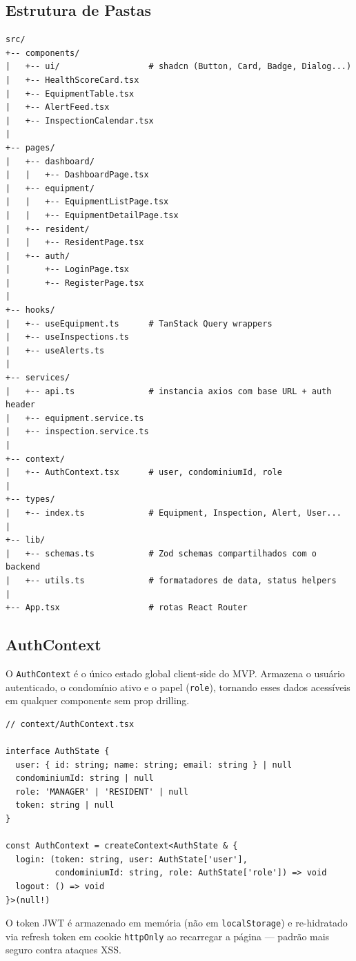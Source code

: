 \documentclass[12pt, a4paper]{article}
\begin{document}
\subsection{Estrutura de Pastas}

\begin{verbatim}
src/
+-- components/
|   +-- ui/                  # shadcn (Button, Card, Badge, Dialog...)
|   +-- HealthScoreCard.tsx
|   +-- EquipmentTable.tsx
|   +-- AlertFeed.tsx
|   +-- InspectionCalendar.tsx
|
+-- pages/
|   +-- dashboard/
|   |   +-- DashboardPage.tsx
|   +-- equipment/
|   |   +-- EquipmentListPage.tsx
|   |   +-- EquipmentDetailPage.tsx
|   +-- resident/
|   |   +-- ResidentPage.tsx
|   +-- auth/
|       +-- LoginPage.tsx
|       +-- RegisterPage.tsx
|
+-- hooks/
|   +-- useEquipment.ts      # TanStack Query wrappers
|   +-- useInspections.ts
|   +-- useAlerts.ts
|
+-- services/
|   +-- api.ts               # instancia axios com base URL + auth header
|   +-- equipment.service.ts
|   +-- inspection.service.ts
|
+-- context/
|   +-- AuthContext.tsx      # user, condominiumId, role
|
+-- types/
|   +-- index.ts             # Equipment, Inspection, Alert, User...
|
+-- lib/
|   +-- schemas.ts           # Zod schemas compartilhados com o backend
|   +-- utils.ts             # formatadores de data, status helpers
|
+-- App.tsx                  # rotas React Router
\end{verbatim}

\subsection{AuthContext}

O \texttt{AuthContext} é o único estado global client-side do MVP. Armazena
o usuário autenticado, o condomínio ativo e o papel (\texttt{role}), tornando
esses dados acessíveis em qualquer componente sem prop drilling.

\begin{verbatim}
// context/AuthContext.tsx

interface AuthState {
  user: { id: string; name: string; email: string } | null
  condominiumId: string | null
  role: 'MANAGER' | 'RESIDENT' | null
  token: string | null
}

const AuthContext = createContext<AuthState & {
  login: (token: string, user: AuthState['user'],
          condominiumId: string, role: AuthState['role']) => void
  logout: () => void
}>(null!)
\end{verbatim}

O token JWT é armazenado em memória (não em \texttt{localStorage}) e
re-hidratado via refresh token em cookie \texttt{httpOnly} ao recarregar
a página --- padrão mais seguro contra ataques XSS.
\end{document}
